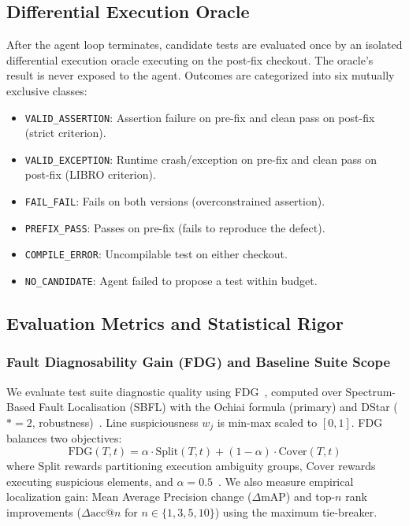 \documentclass[12pt, a4paper]{article}
\begin{document}
\subsection{Differential Execution Oracle}\label{sec:oracle}

After the agent loop terminates, candidate tests are evaluated once by an isolated differential execution oracle executing on the post-fix checkout.
The oracle's result is never exposed to the agent.
Outcomes are categorized into six mutually exclusive classes:
\begin{itemize}[leftmargin=*]
  \item \texttt{VALID\_ASSERTION}: Assertion failure on pre-fix and clean pass on post-fix (strict criterion).
  \item \texttt{VALID\_EXCEPTION}: Runtime crash/exception on pre-fix and clean pass on post-fix (LIBRO criterion).
  \item \texttt{FAIL\_FAIL}: Fails on both versions (overconstrained assertion).
  \item \texttt{PREFIX\_PASS}: Passes on pre-fix (fails to reproduce the defect).
  \item \texttt{COMPILE\_ERROR}: Uncompilable test on either checkout.
  \item \texttt{NO\_CANDIDATE}: Agent failed to propose a test within budget.
\end{itemize}

\subsection{Evaluation Metrics and Statistical Rigor}\label{sec:fdg}

\subsubsection{Fault Diagnosability Gain (FDG) and Baseline Suite Scope}

We evaluate test suite diagnostic quality using FDG~\citep{an2022fdg}, computed over Spectrum-Based Fault Localisation (SBFL) with the Ochiai formula (primary) and DStar ($*=2$, robustness)~\citep{wong2014dstar}.
Line suspiciousness $w_j$ is min-max scaled to $[0,1]$.
FDG balances two objectives:
\begin{equation}
  \text{FDG}(T, t) = \alpha \cdot \text{Split}(T, t) + (1 - \alpha) \cdot \text{Cover}(T, t)
\end{equation}
where $\text{Split}$ rewards partitioning execution ambiguity groups, $\text{Cover}$ rewards executing suspicious elements, and $\alpha = 0.5$~\citep{an2022fdg}.
We also measure empirical localization gain: Mean Average Precision change ($\Delta\text{mAP}$) and top-$n$ rank improvements ($\Delta\text{acc@}n$ for $n \in \{1, 3, 5, 10\}$) using the maximum tie-breaker.
\end{document}
